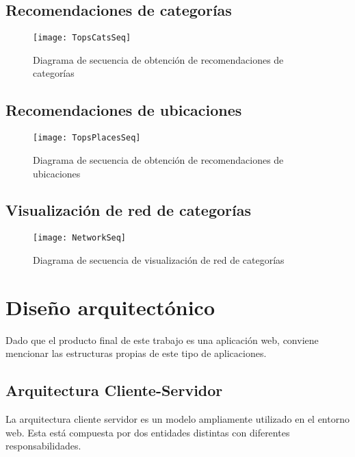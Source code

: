 \subsection{Recomendaciones de categorías}
	\begin{figure}[!h]
	\centering
	\texttt{[image: TopsCatsSeq]}
	\caption{Diagrama de secuencia de obtención de recomendaciones de categorías}\label{TopsCatsSeq}
\end{figure}
\FloatBarrier
\newpage
\subsection{Recomendaciones de ubicaciones}
	\begin{figure}[!h]
	\centering
	\texttt{[image: TopsPlacesSeq]}
	\caption{Diagrama de secuencia de obtención de recomendaciones de ubicaciones}\label{TopsPlacesSeq}
\end{figure}
\FloatBarrier

\newpage
\subsection{Visualización de red de categorías}
	\begin{figure}[!h]
	\centering
	\texttt{[image: NetworkSeq]}
	\caption{Diagrama de secuencia de visualización de red de categorías}\label{NetworkSeq}
\end{figure}
\FloatBarrier
\newpage

\section{Diseño arquitectónico}

Dado que el producto final de este trabajo es una aplicación web, conviene mencionar las estructuras propias de este tipo de aplicaciones.

\subsection{Arquitectura Cliente-Servidor}
La arquitectura cliente servidor es un modelo ampliamente utilizado en el entorno web. Esta está compuesta por dos entidades distintas con diferentes responsabilidades.


